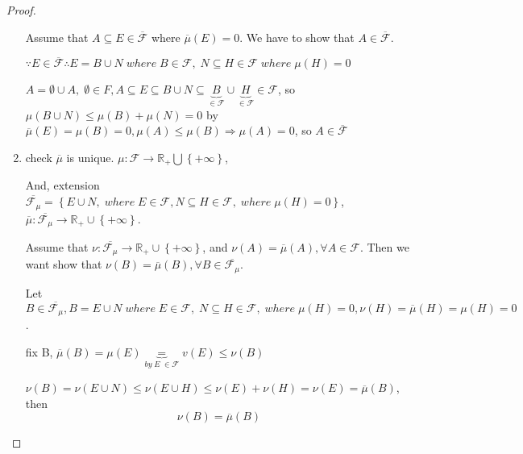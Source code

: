 \begin{proof}
\begin{enumerate}
		Assume that $ A \subseteq E \in \overline {\mathcal{F}} $ where $\overline \mu  \left( E \right) = 0$. We have to show that $ A \in \overline {\mathcal{F}} $.
		
		$\because E \in \overline {\mathcal{F}} \therefore E = B \cup N\;where\;B \in \mathcal{F},\;N \subseteq H \in  {\mathcal{F}} \;where\;\mu \left( H \right) = 0$
		
		$A = \emptyset  \cup A,\;\emptyset  \in F,A \subseteq E \subseteq B \cup N \subseteq \underbrace B_{ \in {\mathcal{F}}} \cup \underbrace H_{ \in {\mathcal{F}}} \in \mathcal{F}$, so $\mu \left( {B \cup N} \right) \leqslant \mu \left( B \right) + \mu \left( N \right) = 0$
		by $\overline \mu  \left( E \right) = \mu \left( B \right) = 0,\mu \left( A \right) \leqslant \mu \left( B \right) \Rightarrow \mu \left( A \right) = 0$, so $A \in \overline {\mathcal{F}} $
		\item check $\overline \mu  $ is unique. $ \mu : \mathcal{F} \to \mathbb{R}_{+} \bigcup \left\{ { + \infty } \right\} $, 
		
		And,  extension $\overline {{{\mathcal{F}}} _\mu}  = \left\{ {E \cup N,\;where\;E \in {\mathcal{F}},N \subseteq H \in \mathcal{F},\;where\;\mu \left( H \right) = 0} \right\}$, $\overline \mu  : \overline {{\mathcal{F}_\mu }}  \to {\mathbb{R}_ + } \cup \left\{ { + \infty } \right\} $.
		
		Assume that $\nu :\overline {{\mathcal{F}_\mu }}  \to {\mathbb{R}_ + } \cup \left\{ { + \infty } \right\}$, and $\nu \left( A \right) = \overline \mu  \left( A \right),\forall A \in \mathcal{F}$. Then we want show that $\nu \left( B \right) = \overline \mu  \left( B \right),\forall B \in \overline {{\mathcal{F}_\mu }}. $ 
		
		Let $B \in \overline {{\mathcal{F}_\mu }} ,B = E \cup N\;where\;E \in \mathcal{F},\;N \subseteq H \in \mathcal{F},\;where\;\mu \left( H \right) = 0,\nu \left( H \right) = \overline \mu  \left( H \right) = \mu \left( H \right) = 0$.
		
		fix B, $\overline \mu  \left( B \right) = \mu \left( E \right)\underbrace  = _{by\;E\; \in \mathcal{F}}v\left( E \right) \leqslant \nu \left( B \right)$
		
		$\nu \left( B \right) = \nu \left( {E \cup N} \right) \leqslant \nu \left( {E \cup H} \right) \leqslant \nu \left( E \right) + \nu \left( H \right) = \nu \left( E \right) = \overline \mu  \left( B \right)$, then
		\begin{equation}
		\nu \left( B \right) = \overline \mu  \left( B \right)
		\label{eq8.8}
		\end{equation}
		
		
	\end{enumerate}
\end{proof}

